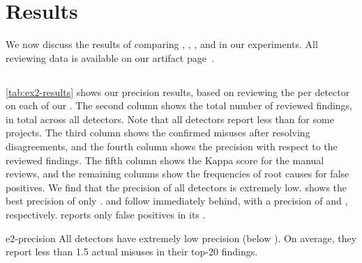 
\section{Results}
\label{sec:results}

We now discuss the results of comparing \Jadet, \GROUMiner, \Tikanga, and \DMMC in our experiments.
All reviewing data is available on our artifact page~\cite{artifact-page}.

\subsection{}

\begin{table*}[tb]
  \centering
  \small
  \caption{: Precision of the Detectors on the  on  and Root Causes for False Positives.}
  
  \label{tab:ex2-results}
\end{table*}

\autoref{tab:ex2-results} shows our precision results, based on reviewing the  per detector on each of our .
The second column shows the total number of reviewed findings,  in total across all detectors.
Note that all detectors report less than  for some projects.
The third column shows the confirmed misuses after resolving disagreements, and the fourth column shows the precision with respect to the reviewed findings.
The fifth column shows the Kappa score for the manual reviews, and the remaining columns show the frequencies of root causes for false positives.
%
We find that the precision of all detectors is extremely low.
\Tikanga shows the best precision of only .
\Jadet and \DMMC follow immediately behind, with a precision of  and , respectively.
\GROUMiner reports only false positives in its .

\begin{obs}{e2-precision}
  All detectors have extremely low precision (below ).
  On average, they report less than 1.5 actual misuses in their top-20 findings.
\end{obs}

